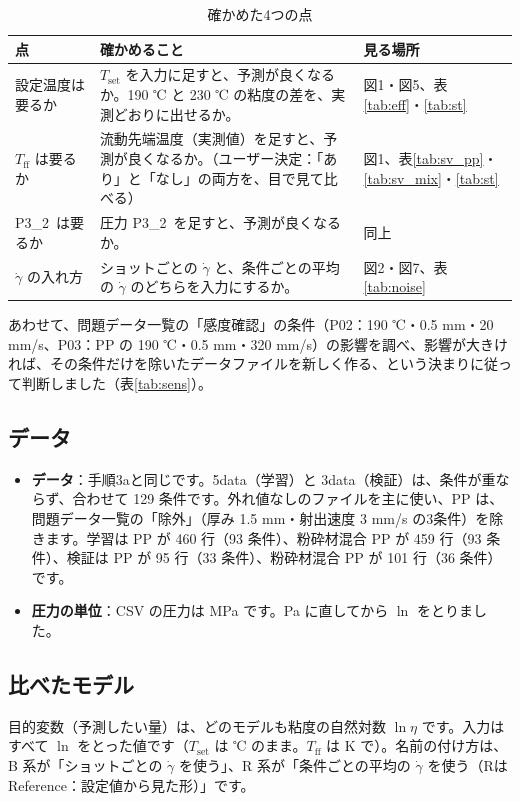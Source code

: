 \documentclass[paper=a4paper,fontsize=10.5pt,line_length=44zw,number_of_lines=38]{jlreq}
\newcommand{\gd}{\dot{\gamma}}
\newcommand{\PII}{P3\_2}
\newcommand{\Tff}{T_{\mathrm{ff}}}
\newcommand{\Tset}{T_{\mathrm{set}}}
\newenvironment{points}{\begin{itemize}[label=$\triangleright$,leftmargin=1.5\zw,itemsep=0.3ex,topsep=0.5ex,parsep=0pt]}{\end{itemize}}
\newcommand{\pt}[1]{\item \textbf{#1}：}
\begin{document}
\begin{table}[H]
\caption{確かめた4つの点}
\begin{tabularx}{\linewidth}{@{}>{\raggedright\arraybackslash}p{9\zw}>{\raggedright\arraybackslash}p{19\zw}X@{}}
\toprule
点 & 確かめること & 見る場所 \\
\midrule
1 設定温度は要るか & $\Tset$ を入力に足すと、予測が良くなるか。190 ℃ と 230 ℃ の粘度の差を、実測どおりに出せるか。 & 図1・図5、表\ref{tab:eff}・\ref{tab:st} \\
2 $\Tff$ は要るか & 流動先端温度（実測値）を足すと、予測が良くなるか。（ユーザー決定：「あり」と「なし」の両方を、目で見て比べる） & 図1、表\ref{tab:sv_pp}・\ref{tab:sv_mix}・\ref{tab:st} \\
3 \PII\ は要るか & 圧力 \PII\ を足すと、予測が良くなるか。 & 同上 \\
4 $\gd$ の入れ方 & ショットごとの $\gd$ と、条件ごとの平均の $\gd$ のどちらを入力にするか。 & 図2・図7、表\ref{tab:noise} \\
\bottomrule
\end{tabularx}
\end{table}

あわせて、問題データ一覧の「感度確認」の条件（P02：190 ℃・0.5 mm・20 mm/s、P03：PP の 190 ℃・0.5 mm・320 mm/s）の影響を調べ、影響が大きければ、その条件だけを除いたデータファイルを新しく作る、という決まりに従って判断しました（表\ref{tab:sens}）。

\subsection{データ}
\begin{points}
\pt{データ}手順3aと同じです。5data（学習）と 3data（検証）は、条件が重ならず、合わせて 129 条件です。外れ値なしのファイルを主に使い、PP は、問題データ一覧の「除外」（厚み 1.5 mm・射出速度 3 mm/s の3条件）を除きます。学習は PP が 460 行（93 条件）、粉砕材混合 PP が 459 行（93 条件）、検証は PP が 95 行（33 条件）、粉砕材混合 PP が 101 行（36 条件）です。
\pt{圧力の単位}CSV の圧力は MPa です。Pa に直してから $\ln$ をとりました。
\end{points}

\subsection{比べたモデル}
目的変数（予測したい量）は、どのモデルも粘度の自然対数 $\ln\eta$ です。入力はすべて $\ln$ をとった値です（$\Tset$ は ℃ のまま。$\Tff$ は K で）。名前の付け方は、B 系が「ショットごとの $\gd$ を使う」、R 系が「条件ごとの平均の $\gd$ を使う（Rは Reference：設定値から見た形）」です。
\end{document}
